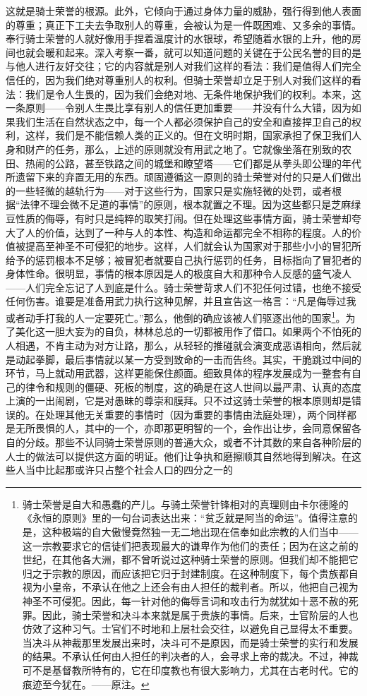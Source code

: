 \documentclass[12pt,oneside]{book}
\begin{document}
这就是骑士荣誉的根源。此外，它倾向于通过身体力量的威胁，强行得到他人表面的尊重；真正下工夫去争取别人的尊重，会被认为是一件既困难、又多余的事情。奉行骑士荣誉的人就好像用手捏着温度计的水银球，希望随着水银的上升，他的房间也就会暖和起来。深入考察一番，就可以知道问题的关键在于公民名誉的目的是与他人进行友好交往；它的内容就是别人对我们这样的看法：我们是值得人们完全信任的，因为我们绝对尊重别人的权利。但骑士荣誉却立足于别人对我们这样的看法：我们是令人生畏的，因为我们会绝对地、无条件地保护我们的权利。本来，这一条原则——令别人生畏比享有别人的信任更加重要——并没有什么大错，因为如果我们生活在自然状态之中，每一个人都必须保护自己的安全和直接捍卫自己的权利，这样，我们是不能信赖人类的正义的。但在文明时期，国家承担了保卫我们人身和财产的任务，那么，上述的原则就没有用武之地了。它就像坐落在别致的农田、热闹的公路，甚至铁路之间的城堡和瞭望塔——它们都是从拳头即公理的年代所遗留下来的弃置无用的东西。顽固遵循这一原则的骑士荣誉对付的只是人们做出的一些轻微的越轨行为——对于这些行为，国家只是实施轻微的处罚，或者根据“法律不理会微不足道的事情”的原则，根本就置之不理。因为这些都只是芝麻绿豆性质的侮辱，有时只是纯粹的取笑打闹。但在处理这些事情方面，骑士荣誉却夸大了人的价值，达到了一种与人的本性、构造和命运都完全不相称的程度。人的价值被提高至神圣不可侵犯的地步。这样，人们就会认为国家对于那些小小的冒犯所给予的惩罚根本不足够；被冒犯者就要自己执行惩罚的任务，目标指向了冒犯者的身体性命。很明显，事情的根本原因是人的极度自大和那种令人反感的盛气凌人——人们完全忘记了人到底是什么。骑士荣誉苛求人们不犯任何过错，也绝不接受任何伤害。谁要是准备用武力执行这种见解，并且宣告这一格言：“凡是侮辱过我或者动手打我的人一定要死亡。”那么，他倒的确应该被人们驱逐出他的国家\footnote{骑士荣誉是自大和愚蠢的产儿。与骑土荣誉针锋相对的真理则由卡尔德隆的《永恒的原则》里的一句台词表达出来：“贫乏就是阿当的命运”。值得注意的是，这种极端的自大傲慢竟然独一无二地出现在信奉如此宗教的人们当中——这一宗教要求它的信徒们把表现最大的谦卑作为他们的责任；因为在这之前的世纪，在其他各大洲，都不曾听说过这种骑士荣誉的原则。但我们却不能把它归之于宗教的原因，而应该把它归于封建制度。在这种制度下，每个贵族都自视为小皇帝，不承认在他之上还会有由人担任的裁判者。所以，他把自己视为神圣不可侵犯。因此，每一针对他的侮辱言词和攻击行为就犹如十恶不赦的死罪。因此，骑士荣誉和决斗本来就是属于贵族的事情。后来，士官阶层的人也仿效了这种习气。士官们不时地和上层社会交往，以避免自己显得太不重要。当决斗从神裁那里发展出来时，决斗可不是原因，而是骑士荣誉的实行和发展的结果。不承认任何由人担任的判决者的人，会寻求上帝的裁决。不过，神裁可不是基督教所特有的，它在印度教也有很大影响力，尤其在古老时代。它的痕迹至今犹在。——原注。}。为了美化这一胆大妄为的自负，林林总总的一切都被用作了借口。如果两个不怕死的人相遇，不肯主动为对方让路，那么，从轻轻的推碰就会演变成恶语相向，然后就是动起拳脚，最后事情就以某一方受到致命的一击而告终。其实，干脆跳过中间的环节，马上就动用武器，这样更能保住颜面。细致具体的程序发展成为一整套有自己的律令和规则的僵硬、死板的制度，这的确是在这人世间以最严肃、认真的态度上演的一出闹剧，它是对愚昧的尊崇和膜拜。只不过这骑士荣誉的根本原则却是错误的。在处理其他无关重要的事情时（因为重要的事情由法庭处理），两个同样都是无所畏惧的人，其中的一个，亦即那更明智的一个，会作出让步，会同意保留各自的分歧。那些不认同骑士荣誉原则的普通大众，或者不计其数的来自各种阶层的人士的做法可以提供这方面的明证。他们让争执和磨擦顺其自然地得到解决。在这些人当中比起那或许只占整个社会人口的四分之一的
\end{document}
